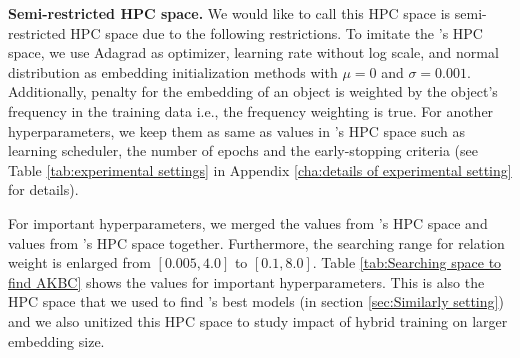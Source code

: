 \noindent\textbf{Semi-restricted HPC space.} We would like to call this HPC space is semi-restricted HPC space due to the following restrictions. To imitate the \cite{chen2021relation}'s HPC space, we use Adagrad as optimizer, learning rate without log scale, and normal distribution as embedding initialization methods with $\mu=0$ and $\sigma=0.001$. Additionally, penalty for the embedding of an object is weighted by the object's frequency in the training data i.e., the frequency weighting is true. For another hyperparameters, we keep them as same as values in \citet{Ruffinelli2020You}'s HPC space such as learning scheduler, the number of epochs and the early-stopping criteria (see Table \ref{tab:experimental settings} in Appendix \ref{cha:details of experimental setting} for details).  

For important hyperparameters, we merged the values from \citet{Ruffinelli2020You}'s HPC space and values from \cite{chen2021relation}'s HPC space together. Furthermore, the searching range for relation weight is enlarged from $[0.005, 4.0]$ to $[0.1, 8.0]$. Table \ref{tab:Searching space to find AKBC} shows the values for important hyperparameters. This is also the HPC space that we used to find \citet{chen2021relation}'s best models (in section \ref{sec:Similarly setting}) and we also unitized this HPC space to study impact of hybrid training on larger embedding size.


